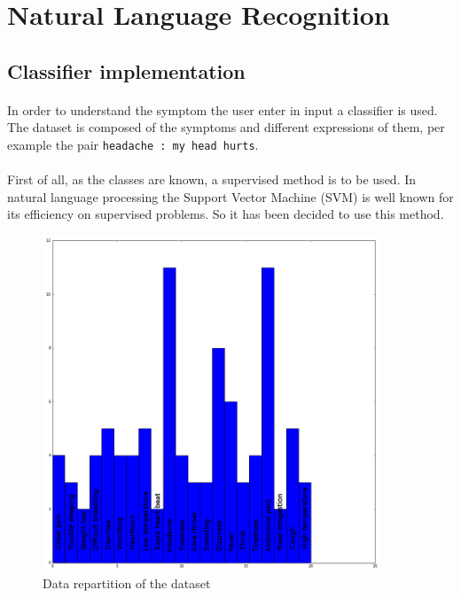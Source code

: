 \section{Natural Language Recognition}

\subsection{Classifier implementation}

\paragraph{}
In order to understand the symptom the user enter in input a classifier is used. The dataset is composed of the symptoms and different expressions of them, per example the pair \texttt{headache : my head hurts}.

\paragraph{}
First of all, as the classes are known, a supervised method is to be used. In natural language processing the Support Vector Machine (SVM)\cite{bib:misc:6} is well known for its efficiency on supervised problems. So it has been decided to use this method. 

\begin{figure}[H]
	\centering
	\includegraphics[height=10cm]{classifier_classes_repartition}
	\caption{Data repartition of the dataset}
	\label{dataset}
\end{figure}

